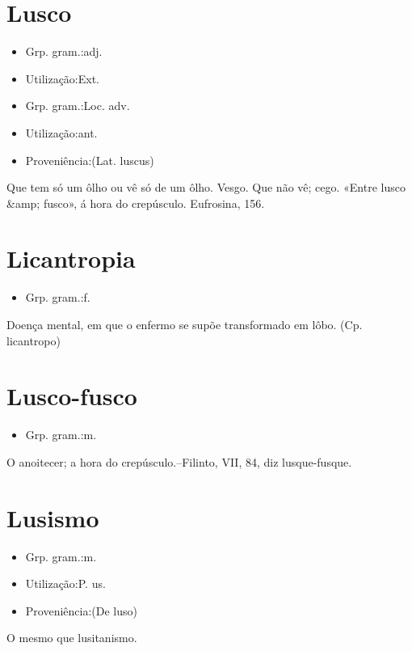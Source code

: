 \section{Lusco}
\begin{itemize}
\item {Grp. gram.:adj.}
\end{itemize}
\begin{itemize}
\item {Utilização:Ext.}
\end{itemize}
\begin{itemize}
\item {Grp. gram.:Loc. adv.}
\end{itemize}
\begin{itemize}
\item {Utilização:ant.}
\end{itemize}
\begin{itemize}
\item {Proveniência:(Lat. \textunderscore luscus\textunderscore )}
\end{itemize}
Que tem só um ôlho ou vê só de um ôlho.
Vesgo.
Que não vê; cego.
«\textunderscore Entre lusco &amp; fusco\textunderscore », á hora do crepúsculo. \textunderscore Eufrosina\textunderscore , 156.
\section{Licantropia}
\begin{itemize}
\item {Grp. gram.:f.}
\end{itemize}
Doença mental, em que o enfermo se supõe transformado em lôbo.
(Cp. \textunderscore licantropo\textunderscore )
\section{Lusco-fusco}
\begin{itemize}
\item {Grp. gram.:m.}
\end{itemize}
O anoitecer; a hora do crepúsculo.--Filinto, VII, 84, diz \textunderscore lusque-fusque\textunderscore .
\section{Lusismo}
\begin{itemize}
\item {Grp. gram.:m.}
\end{itemize}
\begin{itemize}
\item {Utilização:P. us.}
\end{itemize}
\begin{itemize}
\item {Proveniência:(De \textunderscore luso\textunderscore )}
\end{itemize}
O mesmo que \textunderscore lusitanismo\textunderscore .
